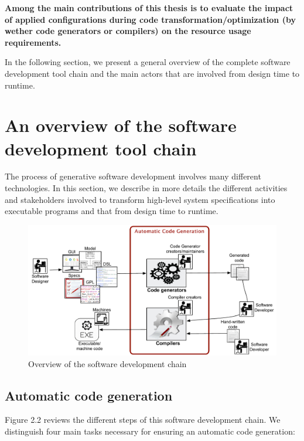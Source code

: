 \textbf{Among the main contributions of this thesis is to evaluate the impact of applied configurations during code transformation/optimization (by wether code generators or compilers) on the resource usage requirements. 
}

In the following section, we present a general overview of the complete software development tool chain and the main actors that are involved from design time to runtime.


\section{An overview of the software development tool chain}
The process of generative software development involves many different technologies. In this section, we describe in more details the different activities and stakeholders involved to transform high-level system specifications into executable programs and that from design time to runtime.
\begin{figure}[h]
	\center
	\includegraphics[scale=0.65]{Background/fig/background_overview2.pdf}
	\caption{Overview of the software development chain}
\end{figure}
\subsection{Automatic code generation}
Figure 2.2 reviews the different steps of this software development chain. We distinguish four main tasks necessary for ensuring an automatic code generation: 

 

